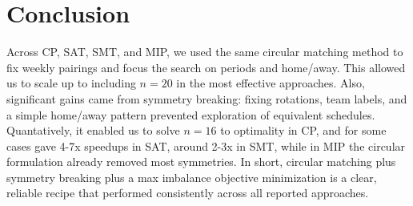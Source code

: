 \section{Conclusion}

Across CP, SAT, SMT, and MIP, we used the same circular matching method to fix weekly pairings and focus the search on periods and home/away.
This allowed us to scale up to including $n = 20$ in the most effective approaches.
Also, significant gains came from symmetry breaking: fixing rotations, team labels, and a simple home/away pattern prevented exploration of equivalent schedules.
Quantatively, it enabled us to solve $n=16$ to optimality in CP, and for some cases gave 4-7x speedups in SAT, around 2-3x in SMT, while in MIP the circular formulation already removed most symmetries.
In short, circular matching plus symmetry breaking plus a max imbalance objective minimization is a clear, reliable recipe that performed consistently across all reported approaches. 
